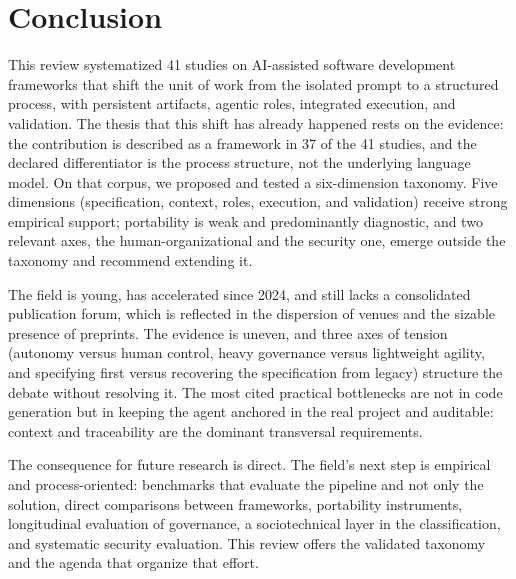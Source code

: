 \section{Conclusion}

This review systematized 41 studies on AI-assisted software development frameworks that shift the unit of work from the isolated prompt to a structured process, with persistent artifacts, agentic roles, integrated execution, and validation. The thesis that this shift has already happened rests on the evidence: the contribution is described as a framework in 37 of the 41 studies, and the declared differentiator is the process structure, not the underlying language model. On that corpus, we proposed and tested a six-dimension taxonomy. Five dimensions (specification, context, roles, execution, and validation) receive strong empirical support; portability is weak and predominantly diagnostic, and two relevant axes, the human-organizational and the security one, emerge outside the taxonomy and recommend extending it.

The field is young, has accelerated since 2024, and still lacks a consolidated publication forum, which is reflected in the dispersion of venues and the sizable presence of preprints. The evidence is uneven, and three axes of tension (autonomy versus human control, heavy governance versus lightweight agility, and specifying first versus recovering the specification from legacy) structure the debate without resolving it. The most cited practical bottlenecks are not in code generation but in keeping the agent anchored in the real project and auditable: context and traceability are the dominant transversal requirements.

The consequence for future research is direct. The field's next step is empirical and process-oriented: benchmarks that evaluate the pipeline and not only the solution, direct comparisons between frameworks, portability instruments, longitudinal evaluation of governance, a sociotechnical layer in the classification, and systematic security evaluation. This review offers the validated taxonomy and the agenda that organize that effort.
